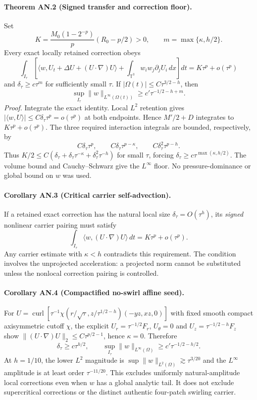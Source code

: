 \paragraph{Theorem AN.2 (Signed transfer and correction floor).}
Set
\[
K=\frac{M_0(1-2^{-p})}{p}(R_0-p/2)>0,\qquad
m=\max\{\kappa,h/2\}.
\]
Every exact locally retained correction obeys
\[
\boxed{\int_{I_\tau}\left[
\langle w,U_t+\Delta U+(U\cdot\nabla)U\rangle+
\int_{\mathbb T^3}w_iw_j\partial_jU_i\,dx
\right]dt=K\tau^p+o(\tau^p)}
\]
and $\boxed{\delta_\tau\ge c\tau^m}$ for sufficiently small $\tau$.
If $|\Omega(t)|\le C\tau^{3/2-h}$, then
\[
\boxed{\sup_{I_\tau}\|w\|_{L^\infty(\Omega(t))}
\ge c'\tau^{-1/2-h+m}.}
\]
\emph{Proof.}
Integrate the exact identity. Local $L^2$ retention gives
$|\langle w,U\rangle|\le C\delta_\tau\tau^p=o(\tau^p)$ at both endpoints. Hence
$M'/2+D$ integrates to $K\tau^p+o(\tau^p)$.
The three required interaction integrals are bounded, respectively, by
\[
C\delta_\tau\tau^p,\qquad
C\delta_\tau\tau^{p-\kappa},\qquad
C\delta_\tau^2\tau^{p-h}.
\]
Thus $K/2\le C(\delta_\tau+\delta_\tau\tau^{-\kappa}+
\delta_\tau^2\tau^{-h})$ for small $\tau$, forcing
$\delta_\tau\ge c\tau^{\max(\kappa,h/2)}$.
The volume bound and Cauchy--Schwarz give the $L^\infty$ floor.
No pressure-dominance or global bound on $w$ was used.

\paragraph{Corollary AN.3 (Critical carrier self-advection).}
If a retained exact correction has the natural local size
$\delta_\tau=O(\tau^h)$, its \emph{signed} nonlinear carrier pairing must satisfy
\[
\boxed{\int_{I_\tau}\langle w,(U\cdot\nabla)U\rangle\,dt
=K\tau^p+o(\tau^p).}
\]
Any carrier estimate with $\kappa<h$ contradicts this requirement.
The condition involves the unprojected acceleration: a projected norm
cannot be substituted unless the nonlocal correction pairing is controlled.

\paragraph{Corollary AN.4 (Compactified no-swirl affine seed).}
For $U=\operatorname{curl}[\tau^{-1}\chi(r/\sqrt\tau,z/\tau^{1/2-h})(-yz,xz,0)]$
with fixed smooth compact axisymmetric cutoff $\chi$, the explicit
$U_r=\tau^{-1/2}F_r$, $U_\theta=0$ and
$U_z=\tau^{-1/2-h}F_z$ show
$\|(U\cdot\nabla)U\|_2\le C\tau^{p/2-1}$, hence $\kappa=0$.
Therefore
\[
\boxed{\delta_\tau\ge c\tau^{h/2},\qquad
\sup_{I_\tau}\|w\|_{L^\infty(\Omega)}\ge c'\tau^{-1/2-h/2}.}
\]
At $h=1/10$, the lower $L^2$ magnitude is
$\sup\|w\|_{L^2(\Omega)}\gtrsim\tau^{3/20}$
and the $L^\infty$ amplitude is at least order $\tau^{-11/20}$.
This excludes uniformly natural-amplitude local corrections even when
$w$ has a global analytic tail. It does not exclude supercritical corrections
or the distinct authentic four-patch swirling carrier.

